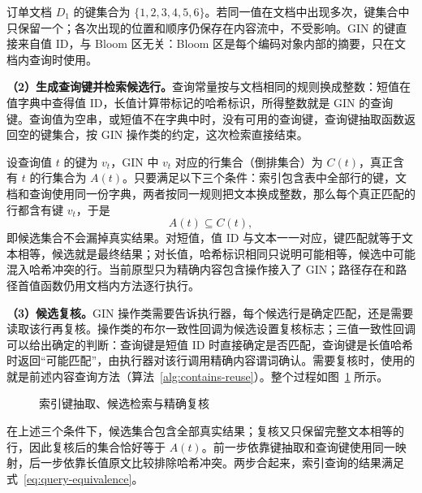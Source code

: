 订单文档 $D_1$ 的键集合为 $\{1,2,3,4,5,6\}$。若同一值在文档中出现多次，键集合中只保留一个；各次出现的位置和顺序仍保存在内容流中，不受影响。GIN 的键直接来自值 ID，与 Bloom 区无关：Bloom 区是每个编码对象内部的摘要，只在文档内查询时使用。

\textbf{（2）生成查询键并检索候选行。}查询常量按与文档相同的规则换成整数：短值在值字典中查得值 ID，长值计算带标记的哈希标识，所得整数就是 GIN 的查询键。查询值为空串，或短值不在字典中时，没有可用的查询键，查询键抽取函数返回空的键集合，按 GIN 操作类的约定，这次检索直接结束。

设查询值 $t$ 的键为 $v_t$，GIN 中 $v_t$ 对应的行集合（倒排集合）为 $C(t)$，真正含有 $t$ 的行集合为 $A(t)$。只要满足以下三个条件：索引包含表中全部行的键，文档和查询使用同一份字典，两者按同一规则把文本换成整数，那么每个真正匹配的行都含有键 $v_t$，于是
\[
A(t)\subseteq C(t),
\]
即候选集合不会漏掉真实结果。对短值，值 ID 与文本一一对应，键匹配就等于文本相等，候选就是最终结果；对长值，哈希标识相同只说明可能相等，候选中可能混入哈希冲突的行。当前原型只为精确内容包含操作接入了 GIN；路径存在和路径首值函数仍用文档内方法逐行执行。

\textbf{（3）候选复核。}GIN 操作类需要告诉执行器，每个候选行是确定匹配，还是需要读取该行再复核。操作类的布尔一致性回调为候选设置复核标志；三值一致性回调可以给出确定的判断：查询键是短值 ID 时直接确定是否匹配，查询键是长值哈希时返回“可能匹配”，由执行器对该行调用精确内容谓词确认。需要复核时，使用的就是前述内容查询方法（算法~\ref{alg:contains-reuse}）。整个过程如图~\ref{fig:gin-reuse-recheck} 所示。
\begin{figure}[htbp]
\centering
{}
\caption{索引键抽取、候选检索与精确复核}
\label{fig:gin-reuse-recheck}
\end{figure}
在上述三个条件下，候选集合包含全部真实结果；复核又只保留完整文本相等的行，因此复核后的集合恰好等于 $A(t)$。前一步依靠键抽取和查询键使用同一映射，后一步依靠长值原文比较排除哈希冲突。两步合起来，索引查询的结果满足式~\eqref{eq:query-equivalence}。

